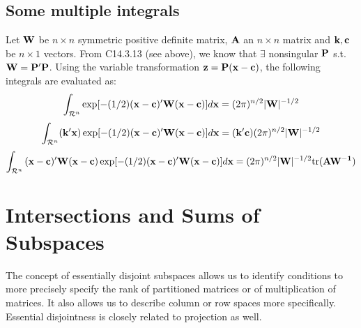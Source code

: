 \documentclass[a4paper, oneside]{book}
\begin{document}
\section{Some multiple integrals}
Let $\mathbf W$ be $n\times n$ symmetric positive definite matrix, $\mathbf A$ an $n\times n$ matrix and $\mathbf{k,c}$ be $n\times 1$ vectors. From C14.3.13 (see above), we know that $\exists$ nonsingular $\mathbf P$ s.t. $\mathbf{W=P'P}$. Using the variable transformation $\mathbf{z=P(x-c)}$, the following integrals are evaluated as:
%
$$\int_{\mathcal{R}^n}\exp[-(1/2)\mathbf{(x-c)'W(x-c)}]d\mathbf{x} = (2\pi)^{n/2} |\mathbf{W}|^{-1/2}$$
%
$$\int_{\mathcal{R}^n}(\mathbf{k'x})\exp [-(1/2)\mathbf{(x-c)'W(x-c)}] d\mathbf{x} = (\mathbf{k'c})(2\pi)^{n/2} |\mathbf{W}|^{-1/2}$$
$$\int_{\mathcal{R}^n}\mathbf{(x-c)'W(x-c)} \exp [-(1/2)\mathbf{(x-c)'W(x-c)}]  d\mathbf{x}  = (2\pi)^{n/2} |\mathbf{W}|^{-1/2}\text{tr}(\mathbf{AW^{-1}}) $$
















\chapter{Intersections and Sums of Subspaces}
The concept of essentially disjoint subspaces allows us to identify conditions to more precisely specify the rank of partitioned matrices or of multiplication of matrices. It also allows us to describe column or row spaces more specifically. Essential disjointness is closely related to projection as well.
\end{document}
